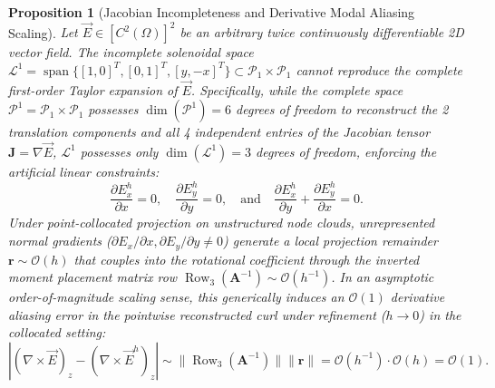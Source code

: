 \documentclass[preprint,12pt]{elsarticle}
\newtheorem{proposition}{Proposition}
\begin{document}
\begin{proposition}[Jacobian Incompleteness and Derivative Modal Aliasing Scaling]
    \label{prop:L1_aliasing}
    Let $\vec{E} \in [C^2(\Omega)]^2$ be an arbitrary twice continuously differentiable 2D vector field. The incomplete solenoidal space $\mathcal{L}^1 = \operatorname{span}\{[1, 0]^T, [0, 1]^T, [y, -x]^T\} \subset \mathcal{P}_1 \times \mathcal{P}_1$ cannot reproduce the complete first-order Taylor expansion of $\vec{E}$. Specifically, while the complete space $\mathcal{P}^1 = \mathcal{P}_1 \times \mathcal{P}_1$ possesses $\dim(\mathcal{P}^1) = 6$ degrees of freedom to reconstruct the 2 translation components and all 4 independent entries of the Jacobian tensor $\mathbf{J} = \nabla\vec{E}$, $\mathcal{L}^1$ possesses only $\dim(\mathcal{L}^1) = 3$ degrees of freedom, enforcing the artificial linear constraints:
    \begin{equation}
        \frac{\partial E_x^h}{\partial x} = 0, \quad \frac{\partial E_y^h}{\partial y} = 0, \quad \text{and} \quad \frac{\partial E_x^h}{\partial y} + \frac{\partial E_y^h}{\partial x} = 0.
        \label{eq:L1_derivative_constraints}
    \end{equation}
    Under point-collocated projection on unstructured node clouds, unrepresented normal gradients ($\partial E_x/\partial x, \partial E_y/\partial y \neq 0$) generate a local projection remainder $\mathbf{r} \sim \mathcal{O}(h)$ that couples into the rotational coefficient through the inverted moment placement matrix row $\operatorname{Row}_3(\mathbf{A}^{-1}) \sim \mathcal{O}(h^{-1})$. In an asymptotic order-of-magnitude scaling sense, this generically induces an $\mathcal{O}(1)$ derivative aliasing error in the pointwise reconstructed curl under refinement ($h \to 0$) in the collocated setting:
    \begin{equation}
        |(\nabla \times \vec{E})_z - (\nabla \times \vec{E}^h)_z| \sim \|\operatorname{Row}_3(\mathbf{A}^{-1})\| \|\mathbf{r}\| = \mathcal{O}(h^{-1}) \cdot \mathcal{O}(h) = \mathcal{O}(1).
        \label{eq:aliasing_order_proof}
    \end{equation}
\end{proposition}
\end{document}
